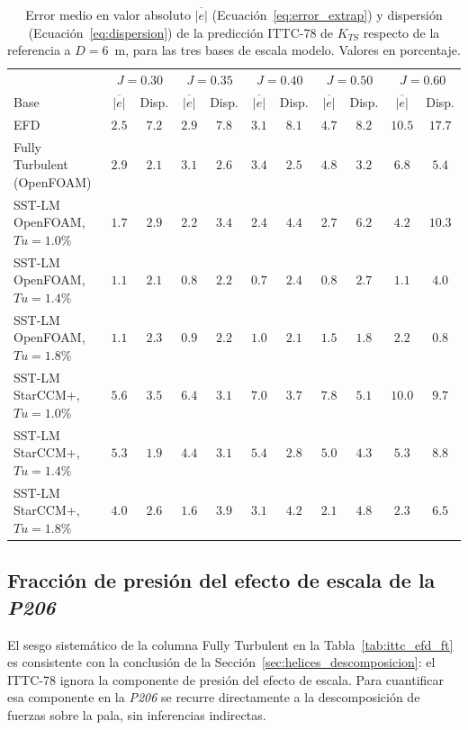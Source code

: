 \begin{table}[htpb]
\centering
\scriptsize
\caption{Error medio en valor absoluto $\overline{|e|}$ (Ecuación~\ref{eq:error_extrap}) y
dispersión (Ecuación~\ref{eq:dispersion}) de la predicción ITTC-78 de $K_{TS}$ respecto de la
referencia a $D=6$~m, para las tres bases de escala modelo. Valores en porcentaje.}
\label{tab:ittc_lm}
\begin{tabular}{lcccccccccc}
\hline
& \multicolumn{2}{c}{$J=0.30$} & \multicolumn{2}{c}{$J=0.35$} & \multicolumn{2}{c}{$J=0.40$} & \multicolumn{2}{c}{$J=0.50$} & \multicolumn{2}{c}{$J=0.60$} \\
Base & $\overline{|e|}$ & Disp. & $\overline{|e|}$ & Disp. & $\overline{|e|}$ & Disp. & $\overline{|e|}$ & Disp. & $\overline{|e|}$ & Disp. \\
\hline
EFD                      & $2.5$ & $7.2$ & $2.9$ & $7.8$ & $3.1$ & $8.1$ & $4.7$ & $8.2$ & $10.5$ & $17.7$ \\
Fully Turbulent (OpenFOAM) & $2.9$ & $2.1$ & $3.1$ & $2.6$ & $3.4$ & $2.5$ & $4.8$ & $3.2$ & $6.8$ & $5.4$ \\
\hline
SST-LM OpenFOAM, $Tu=1.0\%$ & $1.7$ & $2.9$ & $2.2$ & $3.4$ & $2.4$ & $4.4$ & $2.7$ & $6.2$ & $4.2$ & $10.3$ \\
SST-LM OpenFOAM, $Tu=1.4\%$ & $1.1$ & $2.1$ & $0.8$ & $2.2$ & $0.7$ & $2.4$ & $0.8$ & $2.7$ & $1.1$ & $4.0$ \\
SST-LM OpenFOAM, $Tu=1.8\%$ & $1.1$ & $2.3$ & $0.9$ & $2.2$ & $1.0$ & $2.1$ & $1.5$ & $1.8$ & $2.2$ & $0.8$ \\
SST-LM StarCCM+, $Tu=1.0\%$ & $5.6$ & $3.5$ & $6.4$ & $3.1$ & $7.0$ & $3.7$ & $7.8$ & $5.1$ & $10.0$ & $9.7$ \\
SST-LM StarCCM+, $Tu=1.4\%$ & $5.3$ & $1.9$ & $4.4$ & $3.1$ & $5.4$ & $2.8$ & $5.0$ & $4.3$ & $5.3$ & $8.8$ \\
SST-LM StarCCM+, $Tu=1.8\%$ & $4.0$ & $2.6$ & $1.6$ & $3.9$ & $3.1$ & $4.2$ & $2.1$ & $4.8$ & $2.3$ & $6.5$ \\
\hline
\end{tabular}
\end{table}

\subsection{Fracción de presión del efecto de escala de la \textit{P206}}
\label{sec:coreana_fp_correccion}

El sesgo sistemático de la columna Fully Turbulent en la Tabla~\ref{tab:ittc_efd_ft}
es consistente con la conclusión de la Sección~\ref{sec:helices_descomposicion}: el
ITTC-78 ignora la componente de presión del efecto de escala. Para cuantificar esa
componente en la \textit{P206} se recurre directamente a la descomposición de fuerzas sobre la
pala, sin inferencias indirectas.

